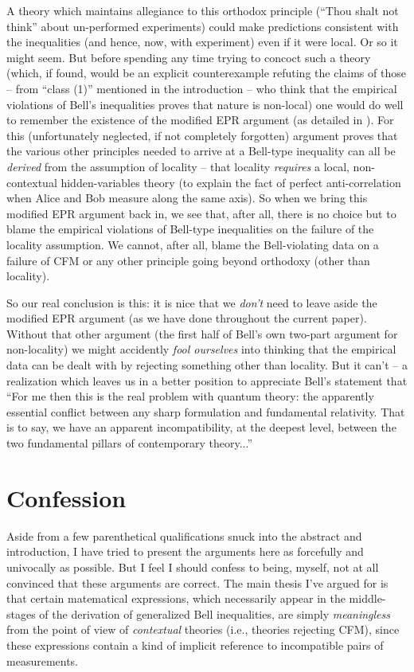 \documentclass[aps,prc,onecolumn,12pt]{revtex4-2}
\begin{document}
A theory which maintains allegiance to this orthodox principle (``Thou
shalt not think'' about un-performed experiments) could make
predictions consistent with the inequalities (and hence, now, with
experiment) even if it were local.  Or so it might seem.  But before
spending any time trying to concoct such a theory (which, if found,
would be an explicit counterexample refuting the claims of those -- from
``class (1)'' mentioned in the introduction -- who think that the
empirical violations of Bell's inequalities proves that nature is non-local)
one would do well to remember the existence of the modified EPR
argument (as detailed in \cite{nonlocchar}).  For this (unfortunately
neglected, if not completely forgotten) argument proves that the
various other principles needed to arrive at a Bell-type inequality can
all be \emph{derived} from the assumption of locality -- that locality
\emph{requires} a local, non-contextual hidden-variables theory (to
explain the fact of perfect anti-correlation when Alice and Bob measure
along the same axis).  So when we bring this modified EPR argument
back in, we see that, after all, there is no choice but to blame the
empirical violations of Bell-type inequalities on the failure of the
locality assumption.  We cannot, after all, blame the Bell-violating
data on a failure of CFM or any other principle going beyond
orthodoxy (other than locality).  

So our real conclusion is this:  
it is nice that we \emph{don't} need to leave aside the
modified EPR argument (as we have done throughout the current paper).
Without that other argument (the first half of Bell's own two-part
argument for non-locality) we might accidently \emph{fool ourselves}
into thinking that the empirical data can be dealt with by rejecting
something other than locality.  But it can't -- a realization
which leaves us in a better position 
to appreciate Bell's statement that ``For me then this is
the real problem with quantum theory:  the apparently essential
conflict between any sharp formulation and fundamental relativity.
That is to say, we have an apparent incompatibility, at the deepest
level, between the two fundamental pillars of contemporary theory...''
\cite[pg 172]{bell}


\section{Confession}

Aside from a few parenthetical qualifications snuck into the abstract
and introduction, I have tried to present the arguments here as
forcefully and univocally as possible.  But I feel I should confess to
being, myself, not at all convinced that these arguments are 
correct.  The main thesis I've argued for is that certain matematical
expressions, which necessarily appear in the middle-stages of the
derivation of generalized Bell inequalities, are simply
\emph{meaningless} from the point of view of \emph{contextual}
theories (i.e., theories rejecting CFM), since these expressions
contain a kind of implicit reference to incompatible pairs of
measurements.  
\end{document}
